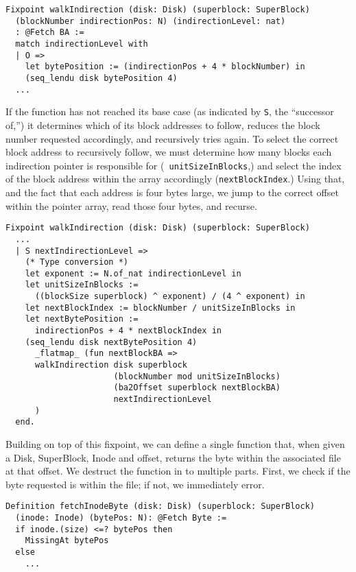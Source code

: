\documentclass[nocopyrightspace,preprint]{sigplanconf}
\begin{document}
\begin{lstlisting}
Fixpoint walkIndirection (disk: Disk) (superblock: SuperBlock)
  (blockNumber indirectionPos: N) (indirectionLevel: nat) 
  : @Fetch BA :=
  match indirectionLevel with
  | O => 
    let bytePosition := (indirectionPos + 4 * blockNumber) in
    (seq_lendu disk bytePosition 4)
  ...
\end{lstlisting}

If the function has not reached its base case (as indicated by {\tt S}, the
``successor of,'') it determines which of its block addresses to follow,
reduces the block number requested accordingly, and recursively tries again.
To select the correct block address to recursively follow, we must determine
how many blocks each indirection pointer is responsible for ({\tt
unitSizeInBlocks},) and select the index of the block address within the array
accordingly ({\tt nextBlockIndex}.) Using that, and the fact that each address
is four bytes large, we jump to the correct offset within the pointer array,
read those four bytes, and recurse.

\begin{lstlisting}
Fixpoint walkIndirection (disk: Disk) (superblock: SuperBlock)
  ...
  | S nextIndirectionLevel =>
    (* Type conversion *)
    let exponent := N.of_nat indirectionLevel in
    let unitSizeInBlocks := 
      ((blockSize superblock) ^ exponent) / (4 ^ exponent) in
    let nextBlockIndex := blockNumber / unitSizeInBlocks in
    let nextBytePosition := 
      indirectionPos + 4 * nextBlockIndex in
    (seq_lendu disk nextBytePosition 4) 
      _flatmap_ (fun nextBlockBA =>
      walkIndirection disk superblock 
                      (blockNumber mod unitSizeInBlocks)
                      (ba2Offset superblock nextBlockBA)
                      nextIndirectionLevel
      )
  end.
\end{lstlisting}

Building on top of this fixpoint, we can define a single function that, when
given a Disk, SuperBlock, Inode and offset, returns the byte within the
associated file at that offset. We destruct the function in to multiple parts.
First, we check if the byte requested is within the file; if not, we
immediately error.

\begin{lstlisting}
Definition fetchInodeByte (disk: Disk) (superblock: SuperBlock)
  (inode: Inode) (bytePos: N): @Fetch Byte :=
  if inode.(size) <=? bytePos then 
    MissingAt bytePos
  else 
    ...
\end{lstlisting}
\end{document}
